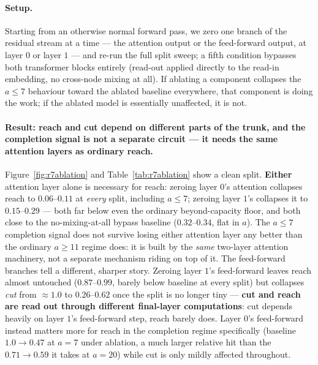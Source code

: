 \documentclass[11pt,a4paper]{article}
\begin{document}
\paragraph{Setup.} Starting from an otherwise normal forward pass, we zero one
branch of the residual stream at a time --- the attention output or the
feed-forward output, at layer $0$ or layer $1$ --- and re-run the full split
sweep; a fifth condition bypasses both transformer blocks entirely (read-out
applied directly to the read-in embedding, no cross-node mixing at all). If
ablating a component collapses the $a\le7$ behaviour toward the ablated
baseline everywhere, that component is doing the work; if the ablated model
is essentially unaffected, it is not.

\paragraph{Result: reach and cut depend on different parts of the trunk, and
the completion signal is not a separate circuit --- it needs the same
attention layers as ordinary reach.} Figure~\ref{fig:r7ablation} and
Table~\ref{tab:r7ablation} show a clean split. \textbf{Either} attention layer
alone is necessary for reach: zeroing layer $0$'s attention collapses reach to
$0.06$--$0.11$ at \emph{every} split, including $a\le7$; zeroing layer $1$'s
collapses it to $0.15$--$0.29$ --- both far below even the ordinary
beyond-capacity floor, and both close to the no-mixing-at-all bypass baseline
($0.32$--$0.34$, flat in $a$). The $a\le7$ completion signal does not survive
losing either attention layer any better than the ordinary $a\ge11$ regime
does: it is built by the \emph{same} two-layer attention machinery, not a
separate mechanism riding on top of it. The feed-forward branches tell a
different, sharper story. Zeroing layer $1$'s feed-forward leaves reach almost
untouched ($0.87$--$0.99$, barely below baseline at every split) but collapses
\emph{cut} from $\approx1.0$ to $0.26$--$0.62$ once the split is no longer
tiny --- \textbf{cut and reach are read out through different final-layer
computations}: cut depends heavily on layer $1$'s feed-forward step, reach
barely does. Layer $0$'s feed-forward instead matters more for reach in the
completion regime specifically (baseline $1.0\to0.47$ at $a=7$ under
ablation, a much larger relative hit than the $0.71\to0.59$ it takes at
$a=20$) while cut is only mildly affected throughout.
\end{document}

